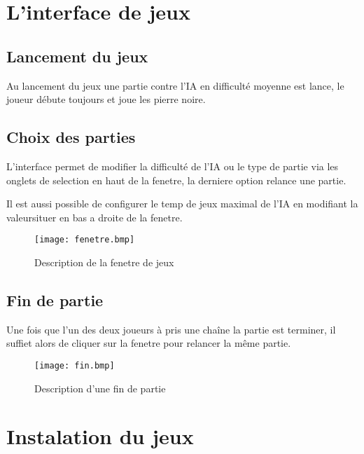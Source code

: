 \section{L'interface de jeux}

	\subsection{Lancement du jeux}
	
		Au lancement du jeux une partie contre l'IA en difficulté moyenne est lance, le joueur débute toujours et joue les pierre noire.
		
	\subsection{Choix des parties}

		L'interface permet de modifier la difficulté de l'IA ou le type de partie via les onglets de selection en haut de la fenetre, la derniere option relance une partie.
		
		Il est aussi possible de configurer le temp de jeux maximal de l'IA en modifiant la valeursituer en bas a droite de la fenetre.
	
		\begin{figure}[10cm]
			\centering
			\texttt{[image: fenetre.bmp]}
			\caption{Description de la fenetre de jeux}
		\end{figure}
	
	\subsection{Fin de partie}
	
		Une fois que l'un des deux joueurs à pris une chaîne la partie est terminer, il suffiet alors de cliquer sur la fenetre pour relancer la même partie. 
		
		\begin{figure}[10cm]
			\centering
			\texttt{[image: fin.bmp]}
			\caption{Description d'une fin de partie}
		\end{figure}
		
\section{Instalation du jeux}
	
	
	
\clearpage
